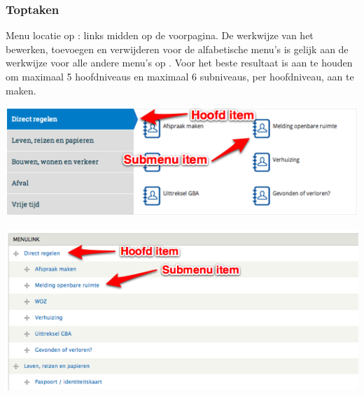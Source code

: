 \bigskip

\subsubsection{Toptaken}\label{toptaken}
Menu locatie op \drupalpath{}: links midden op de voorpagina. De werkwijze van het bewerken, toevoegen en verwijderen voor de alfabetische menu's is gelijk aan de werkwijze voor alle andere menu's op \drupalpath{}. Voor het beste resultaat is aan te houden om maximaal 5 hoofdniveaus en maximaal 6 subniveaus, per hoofdniveau, aan te maken.

\bigskip

\begin{center}
	\includegraphics[width=\textwidth]{img/menu_toptaken.png}
\end{center}

\begin{center}
	\includegraphics[width=\textwidth]{img/menu_toptaken2.png}
\end{center}